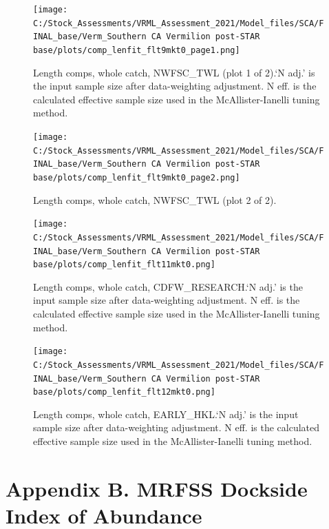 \documentclass[11pt,
  english,
]{article}
\begin{document}
\begin{figure}
\centering
\texttt{[image: C:/Stock\_Assessments/VRML\_Assessment\_2021/Model\_files/SCA/FINAL\_base/Verm\_Southern CA Vermilion post-STAR base/plots/comp\_lenfit\_flt9mkt0\_page1.png]}
\caption{Length comps, whole catch, NWFSC\_TWL (plot 1 of 2).`N adj.' is the input sample size after data-weighting adjustment. N eff. is the calculated effective sample size used in the McAllister-Ianelli tuning method.\label{fig:comp_lenfit_flt9mkt0_page1}}
\end{figure}

\begin{figure}
\centering
\texttt{[image: C:/Stock\_Assessments/VRML\_Assessment\_2021/Model\_files/SCA/FINAL\_base/Verm\_Southern CA Vermilion post-STAR base/plots/comp\_lenfit\_flt9mkt0\_page2.png]}
\caption{Length comps, whole catch, NWFSC\_TWL (plot 2 of 2).\label{fig:comp_lenfit_flt9mkt0_page2}}
\end{figure}

\begin{figure}
\centering
\texttt{[image: C:/Stock\_Assessments/VRML\_Assessment\_2021/Model\_files/SCA/FINAL\_base/Verm\_Southern CA Vermilion post-STAR base/plots/comp\_lenfit\_flt11mkt0.png]}
\caption{Length comps, whole catch, CDFW\_RESEARCH.`N adj.' is the input sample size after data-weighting adjustment. N eff. is the calculated effective sample size used in the McAllister-Ianelli tuning method.\label{fig:comp_lenfit_flt11mkt0}}
\end{figure}

\begin{figure}
\centering
\texttt{[image: C:/Stock\_Assessments/VRML\_Assessment\_2021/Model\_files/SCA/FINAL\_base/Verm\_Southern CA Vermilion post-STAR base/plots/comp\_lenfit\_flt12mkt0.png]}
\caption{Length comps, whole catch, EARLY\_HKL.`N adj.' is the input sample size after data-weighting adjustment. N eff. is the calculated effective sample size used in the McAllister-Ianelli tuning method.\label{fig:comp_lenfit_flt12mkt0}}
\end{figure}

\FloatBarrier


\hypertarget{appendix-b.-mrfss-dockside-index-of-abundance}{%
\section*{Appendix B. MRFSS Dockside Index of Abundance}\label{appendix-b.-mrfss-dockside-index-of-abundance}}
\end{document}
